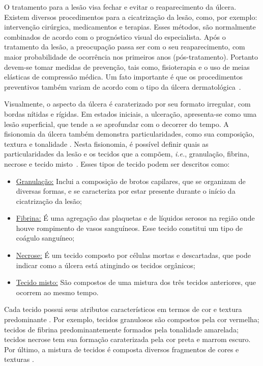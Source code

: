 O tratamento para a lesão visa fechar e evitar o reaparecimento da úlcera.
Existem diversos procedimentos para a cicatrização da lesão, como, por exemplo: intervenção cirúrgica, medicamentos e terapias. 
Esses métodos, são normalmente combinados de acordo com o prognóstico visual do especialista.
Após o tratamento da lesão, a preocupação passa ser com o seu reaparecimento, com maior probabilidade de ocorrência nos primeiros anos (pós-tratamento).
Portanto devem-se tomar medidas de prevenção, tais como, fisioterapia e o uso de meias elásticas de compressão médica.
Um fato importante é que os procedimentos preventivos também variam de acordo com o tipo da úlcera dermatológica~\cite{Abbade2005}.

Visualmente, o aspecto da úlcera é caraterizado por seu formato irregular, com bordas nítidas e rígidas. 
Em estados iniciais, a ulceração, apresenta-se como uma lesão superficial, que tende a se aprofundar com o decorrer do tempo.
A fisionomia da úlcera também demonstra particularidades, como sua composição, textura e tonalidade \cite{Dorileo2010}. 
Nesta fisionomia, é possível definir quais as particularidades da lesão e os tecidos que a compõem, \textit{i.e.}, granulação, fibrina, necrose e tecido misto~\cite{Pereyra2014}.
Esses tipos de tecido podem ser descritos como: 

\begin{itemize}
\item \underline{Granulação:} Inclui a composição de brotos capilares, que se organizam de diversas formas, e se caracteriza por estar presente durante o início da cicatrização da lesão; 

\item \underline{Fibrina:} É uma agregação das plaquetas e de líquidos serosos na região onde houve rompimento de vasos sanguíneos.
Esse tecido constitui um tipo de coágulo sanguíneo; 

\item \underline{Necrose:} É um tecido composto por células mortas e descartadas, que pode indicar como a úlcera está atingindo os tecidos orgânicos;

\item \underline{Tecido misto:} São compostos de uma mistura dos três tecidos anteriores, que ocorrem ao mesmo tempo.
\end{itemize}


Cada tecido possui seus atributos característicos em termos de cor e textura predominante \cite{Pereira2011}.
Por exemplo, tecidos granulosos são compostos pela cor vermelha; tecidos de fibrina predominantemente formados pela tonalidade amarelada; tecidos necrose tem sua formação caraterizada pela cor preta e marrom escuro. Por último, a mistura de tecidos é composta diversos fragmentos de cores e texturas \cite{Chino2018}.   

